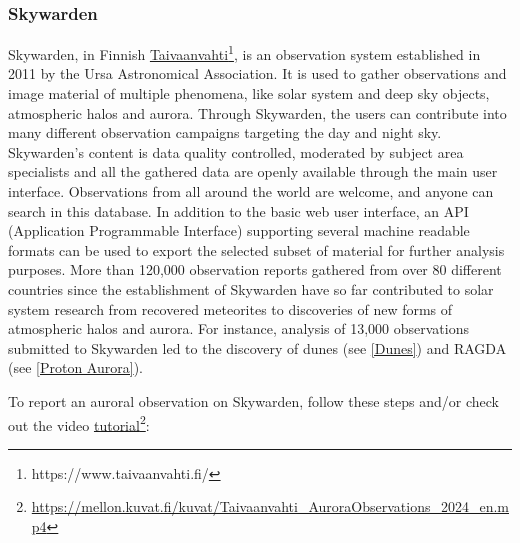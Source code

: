 \documentclass{article}
\newcommand{\contributed}[1]{%
    \par\noindent
    \begingroup
    \setlength{\leftskip}{1em}%
    \itshape
    Contributors: #1
    \par
    \endgroup
    \vspace{0.5em}
}
\begin{document}
\subsubsection{Skywarden}\label{SkyWarden}
Skywarden, in Finnish \href{https://www.taivaanvahti.fi/}{Taivaanvahti}\footnote{https://www.taivaanvahti.fi/}, is an observation system established in 2011 by the Ursa Astronomical Association. It is used to gather observations and image material of multiple phenomena, like solar system and deep sky objects, atmospheric halos and aurora. Through Skywarden, the users can contribute into many different observation campaigns targeting the day and night sky. Skywarden's content is data quality controlled, moderated by subject area specialists and all the gathered data are openly available through the main user interface. Observations from all around the world are welcome, and anyone can search in this database. In addition to the basic web user interface, an API (Application Programmable Interface) supporting several machine readable formats can be used to export the selected subset of material for further analysis purposes. More than 120,000 observation reports gathered from over 80 different countries since the establishment of Skywarden have so far contributed to solar system research from recovered meteorites to discoveries of new forms of atmospheric halos and aurora. For instance, analysis of 13,000 observations submitted to Skywarden led to the discovery of dunes (see \ref{Dunes}) and RAGDA (see \ref{Proton Aurora}). 

To report an auroral observation on Skywarden, follow these steps and/or check out the video
\href{https://mellon.kuvat.fi/kuvat/Taivaanvahti_AuroraObservations_2024_en.mp4}{tutorial}\footnote{\url{https://mellon.kuvat.fi/kuvat/Taivaanvahti_AuroraObservations_2024_en.mp4}}:
\end{document}
